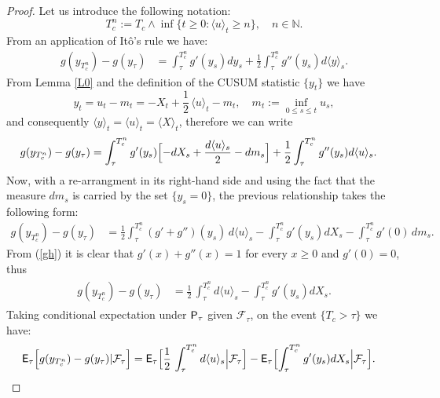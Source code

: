 \documentclass[11pt,reqno]{amsart}
\theoremstyle{remark}
\begin{document}
\begin{proof}
Let us introduce the following notation:
$${T_{c}^{n}} :={T_{c}} \wedge \inf\{t \geq 0: \langle u \rangle_{t} \geq n\}, \quad n \in \mathbb{N}.$$
From an application of It\^{o}'s rule we have:
\begin{align*} 
g(y_{T_{c}^{n}})-g(y_{\tau}) &= \int_{\tau}^{T_{c}^{n}} g'(y_{s}) dy_{s} + \frac{1}{2} \int_{\tau}^{T_{c}^{n}} g''(y_{s}) d\langle y \rangle_{s}.
\end{align*}
From Lemma \ref{L0} and the definition of the CUSUM statistic $\{y_{t}\}$ we have  
$$y_{t}= u_{t}-m_{t}= -X_{t}+ \frac{1}{2} \, \langle u \rangle_{t} -  m_{t}, \quad m_{t}:=\inf_{0 \leq s \leq t} u_{s},$$
and consequently $\langle y \rangle_{t}=  \langle u \rangle_{t}=  \langle X \rangle_{t}$, therefore we can write 
\begin{align*} 
g(y_{T_{c}^{n}})-g(y_{\tau}) &= \int_{\tau}^{T_{c}^{n}} g'(y_{s}) \Bigl[-dX_{s}+ \frac{d\langle u \rangle_{s}}{2} - dm_{s}\Bigr]+ \frac{1}{2} \int_{\tau}^{T_{c}^{n}} g''(y_{s}) d\langle u \rangle_{s}. 
\end{align*}
Now, with a re-arrangment in its right-hand side and using the fact that the measure $dm_{s}$ is carried by the set $\{y_{s}=0\}$,  
the previous relationship takes the following form:
\begin{align*}
g(y_{T_{c}^{n}})-g(y_{\tau}) &= \frac{1}{2}  \int_{\tau}^{T_{c}^{n}} (g'+g'')(y_{s}) \,  d\langle u \rangle_{s} -\int_{\tau}^{T_{c}^{n}} g'(y_{s}) dX_{s} - \int_{\tau}^{T_{c}^{n}} g'(0) \,dm_{s}.
\end{align*}
From (\ref{gh}) it is clear that $g'(x)+g''(x)=1$ for every $x \geq 0$ and $g'(0)=0$, thus
\begin{align*}
\begin{split}
g(y_{T_{c}^{n}})-g(y_{\tau}) &= \frac{1}{2} \, \int_{\tau}^{T_{c}^{n}} d\langle u \rangle_{s} -\int_{\tau}^{T_{c}^{n}} g'(y_{s}) dX_{s}.
\end{split}
\end{align*}
Taking conditional expectation under ${{\sf P}}_{\tau}$ given ${\mathcal{F}}_{\tau}$, on the event $\{{T_{c}} > \tau\}$ we have:
\begin{align} \label{uuu}
{{\sf E}}_{\tau} \Bigl[g(y_{T_{c}^{n}})-g(y_{\tau})|{\mathcal{F}}_{\tau} \Bigr] &= {{\sf E}}_{\tau} \Bigl[ \frac{1}{2} \, \int_{\tau}^{T_{c}^{n}} d\langle u \rangle_{s} \Big| {\mathcal{F}}_{\tau} \Bigr] - {{\sf E}}_{\tau} \Bigl[\int_{\tau}^{T_{c}^{n}} g'(y_{s}) dX_{s} \Big| {\mathcal{F}}_{\tau} \Bigr].
\end{align}

\end{proof}
\end{document}
